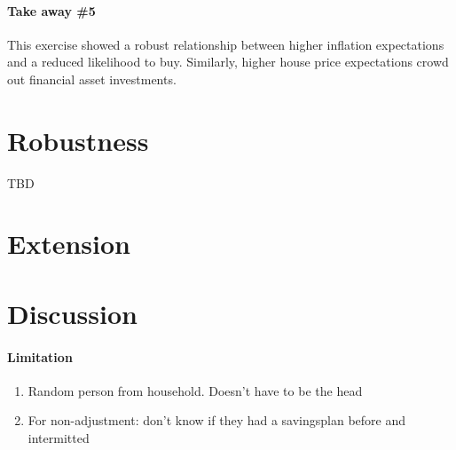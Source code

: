 \documentclass[ProjectABM]{subfiles}
\begin{document}
\paragraph{Take away \#5}
This exercise showed a robust relationship between higher inflation expectations and a reduced likelihood to buy. Similarly, higher house price expectations crowd out financial asset investments.

\section{Robustness}\label{sec:robustness}
TBD

\section{Extension}


\section{Discussion}\label{sec:discussion}
\paragraph{Limitation}
\begin{enumerate}
	\item Random person from household. Doesn't have to be the head
	\item For non-adjustment: don't know if they had a savingsplan before and intermitted
\end{enumerate}


%
\end{document}
